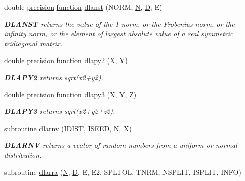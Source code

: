 \begin{DoxyCompactItemize}
double \hyperlink{numinquire_8h_a2c8e616467665d0b2814d4c1589ba74e}{precision} \hyperlink{afunc_8m_a7b5e596df91eadea6c537c0825e894a7}{function} \hyperlink{group__auxOTHERauxiliary_ga2d199841a9ffcf46d31e13e326d195dc}{dlanst} (N\+O\+R\+M, \hyperlink{polmisc_8c_a0240ac851181b84ac374872dc5434ee4}{N}, \hyperlink{odrpack_8h_a7dae6ea403d00f3687f24a874e67d139}{D}, E)
\begin{DoxyCompactList}\small\item\em {\bfseries D\+L\+A\+N\+S\+T} returns the value of the 1-\/norm, or the Frobenius norm, or the infinity norm, or the element of largest absolute value of a real symmetric tridiagonal matrix. \end{DoxyCompactList}\item 
double \hyperlink{numinquire_8h_a2c8e616467665d0b2814d4c1589ba74e}{precision} \hyperlink{afunc_8m_a7b5e596df91eadea6c537c0825e894a7}{function} \hyperlink{group__auxOTHERauxiliary_gacf4c47c2f593fb3a4e842bca6df1240b}{dlapy2} (X, Y)
\begin{DoxyCompactList}\small\item\em {\bfseries D\+L\+A\+P\+Y2} returns sqrt(x2+y2). \end{DoxyCompactList}\item 
double \hyperlink{numinquire_8h_a2c8e616467665d0b2814d4c1589ba74e}{precision} \hyperlink{afunc_8m_a7b5e596df91eadea6c537c0825e894a7}{function} \hyperlink{group__auxOTHERauxiliary_gad929930f6e7780e8a1d73b2515ddd42b}{dlapy3} (X, Y, Z)
\begin{DoxyCompactList}\small\item\em {\bfseries D\+L\+A\+P\+Y3} returns sqrt(x2+y2+z2). \end{DoxyCompactList}\item 
subroutine \hyperlink{group__auxOTHERauxiliary_ga77e05a87ced667cbdb502aa87c72d056}{dlarnv} (I\+D\+I\+S\+T, I\+S\+E\+E\+D, \hyperlink{polmisc_8c_a0240ac851181b84ac374872dc5434ee4}{N}, X)
\begin{DoxyCompactList}\small\item\em {\bfseries D\+L\+A\+R\+N\+V} returns a vector of random numbers from a uniform or normal distribution. \end{DoxyCompactList}\item 
subroutine \hyperlink{group__auxOTHERauxiliary_ga0b5719c25a81a95270cd36178e283166}{dlarra} (\hyperlink{polmisc_8c_a0240ac851181b84ac374872dc5434ee4}{N}, \hyperlink{odrpack_8h_a7dae6ea403d00f3687f24a874e67d139}{D}, E, E2, S\+P\+L\+T\+O\+L, T\+N\+R\+M, N\+S\+P\+L\+I\+T, I\+S\+P\+L\+I\+T, I\+N\+F\+O)

\end{DoxyCompactItemize}
